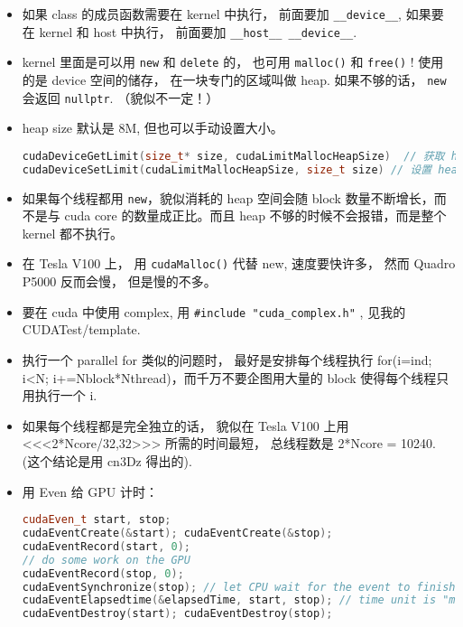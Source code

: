\begin{itemize}
\item 如果 class 的成员函数需要在 kernel 中执行， 前面要加 \verb`__device__`, 如果要在 kernel 和 host 中执行， 前面要加 \verb`__host__ __device__`.
\item kernel 里面是可以用 \verb`new` 和 \verb`delete` 的， 也可用 \verb`malloc()` 和 \verb`free()` ! 使用的是 device 空间的储存， 在一块专门的区域叫做 heap. 如果不够的话， \verb`new` 会返回 \verb`nullptr`. （貌似不一定！）
\item heap size 默认是 8M, 但也可以手动设置大小。
\begin{lstlisting}[language=cpp]
cudaDeviceGetLimit(size_t* size, cudaLimitMallocHeapSize)  // 获取 heap size
cudaDeviceSetLimit(cudaLimitMallocHeapSize, size_t size) // 设置 heap size
\end{lstlisting}
\item 如果每个线程都用 \verb`new`，貌似消耗的 heap 空间会随 block 数量不断增长，而不是与 cuda core 的数量成正比。而且 heap 不够的时候不会报错，而是整个 kernel 都不执行。
\item 在 Tesla V100 上， 用 \verb`cudaMalloc()` 代替 new, 速度要快许多，  然而 Quadro P5000 反而会慢， 但是慢的不多。
\item 要在 cuda 中使用 complex, 用 \verb`#include "cuda_complex.h"` , 见我的 CUDATest/template.
\item 执行一个 parallel for 类似的问题时， 最好是安排每个线程执行 for(i=ind; i<N; i+=Nblock*Nthread)，而千万不要企图用大量的 block 使得每个线程只用执行一个 i.
\item 如果每个线程都是完全独立的话， 貌似在 Tesla V100 上用 <<<2*Ncore/32,32>>> 所需的时间最短， 总线程数是 2*Ncore = 10240. (这个结论是用 cn3Dz 得出的).
\item 用 Even 给 GPU 计时：
\begin{lstlisting}[language=cpp]
cudaEven_t start, stop;
cudaEventCreate(&start); cudaEventCreate(&stop);
cudaEventRecord(start, 0);
// do some work on the GPU
cudaEventRecord(stop, 0);
cudaEventSynchronize(stop); // let CPU wait for the event to finish
cudaEventElapsedtime(&elapsedTime, start, stop); // time unit is "ms"
cudaEventDestroy(start); cudaEventDestroy(stop);
\end{lstlisting}


\end{itemize}
